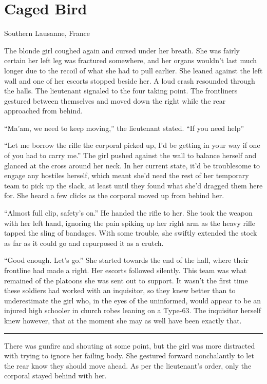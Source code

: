 \chapter{Caged Bird}
\begin{ChapterNote}
Southern Lausanne, France
\end{ChapterNote}
\begin{Standard}
The blonde girl coughed again and cursed under her breath. She was fairly certain
her left leg was fractured somewhere, and her organs wouldn't last much longer due to the
recoil of what she had to pull earlier. She leaned against the
left wall and one of her escorts stopped beside her. A loud crash resounded through
the halls. The lieutenant signaled to the four taking point. The frontliners gestured
between themselves and moved down the right while the rear approached from behind.

``Ma'am, we need to keep moving,'' the lieutenant stated. ``If you need help\textemdash{}''

``Let me borrow the rifle the corporal picked up, I'd be getting in your way if
one of you had to carry me.'' The girl pushed against the wall to balance herself
and glanced at the cross around her neck. In her current state, it'd be troublesome
to engage any hostiles herself, which meant she'd need the rest of her temporary
team to pick up the slack, at least until they found what she'd dragged them here for.
She heard a few clicks as the corporal moved up from behind her.

``Almost full clip, safety's on.'' He handed the rifle to her. She took the weapon
with her left hand, ignoring the pain spiking up her right arm as the heavy rifle
tapped the sling of bandages. With some trouble, she swiftly extended the stock as
far as it could go and repurposed it as a crutch.

``Good enough. Let's go.'' She started towards the end of the hall, where their frontline
had made a right. Her escorts followed silently. This team was what remained of the
platoons she was sent out to support. It wasn't the first time these soldiers had
worked with an inquisitor, so they knew better than to underestimate the girl who,
in the eyes of the uninformed, would appear to be an injured high schooler in church
robes leaning on a Type-63. The inquisitor herself knew however, that at the moment
she may as well have been exactly that.

\fancybreak{* * *}

There was gunfire and shouting at some point, but the girl was more distracted with
trying to ignore her failing body. She gestured forward nonchalantly to let the rear
know they should move ahead. As per the lieutenant's order, only the corporal stayed
behind with her.


\end{Standard}
